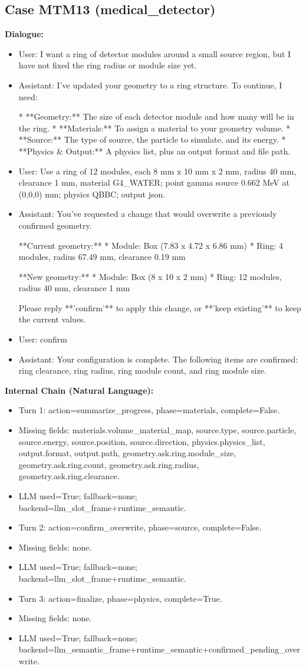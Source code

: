 \documentclass[11pt]{ctexart}
\begin{document}
\subsection{Case MTM13 (medical\_detector)}
\textbf{Dialogue:}
\begin{itemize}
\item User: I want a ring of detector modules around a small source region, but I have not fixed the ring radius or module size yet.
\item Assistant: I've updated your geometry to a ring structure. To continue, I need:

*   **Geometry:** The size of each detector module and how many will be in the ring.
*   **Materials:** To assign a material to your geometry volume.
*   **Source:** The type of source, the particle to simulate, and its energy.
*   **Physics \& Output:** A physics list, plus an output format and file path.
\item User: Use a ring of 12 modules, each 8 mm x 10 mm x 2 mm, radius 40 mm, clearance 1 mm, material G4\_WATER; point gamma source 0.662 MeV at (0,0,0) mm; physics QBBC; output json.
\item Assistant: You've requested a change that would overwrite a previously confirmed geometry.

**Current geometry:**
*   Module: Box (7.83 x 4.72 x 6.86 mm)
*   Ring: 4 modules, radius 67.49 mm, clearance 0.19 mm

**New geometry:**
*   Module: Box (8 x 10 x 2 mm)
*   Ring: 12 modules, radius 40 mm, clearance 1 mm

Please reply **'confirm'** to apply this change, or **'keep existing'** to keep the current values.
\item User: confirm
\item Assistant: Your configuration is complete. The following items are confirmed: ring clearance, ring radius, ring module count, and ring module size.
\end{itemize}
\textbf{Internal Chain (Natural Language):}
\begin{itemize}
\item Turn 1: action=summarize\_progress, phase=materials, complete=False.
\item Missing fields: materials.volume\_material\_map, source.type, source.particle, source.energy, source.position, source.direction, physics.physics\_list, output.format, output.path, geometry.ask.ring.module\_size, geometry.ask.ring.count, geometry.ask.ring.radius, geometry.ask.ring.clearance.
\item LLM used=True; fallback=none; backend=llm\_slot\_frame+runtime\_semantic.
\item Turn 2: action=confirm\_overwrite, phase=source, complete=False.
\item Missing fields: none.
\item LLM used=True; fallback=none; backend=llm\_slot\_frame+runtime\_semantic.
\item Turn 3: action=finalize, phase=physics, complete=True.
\item Missing fields: none.
\item LLM used=True; fallback=none; backend=llm\_semantic\_frame+runtime\_semantic+confirmed\_pending\_overwrite.
\end{itemize}
\end{document}
